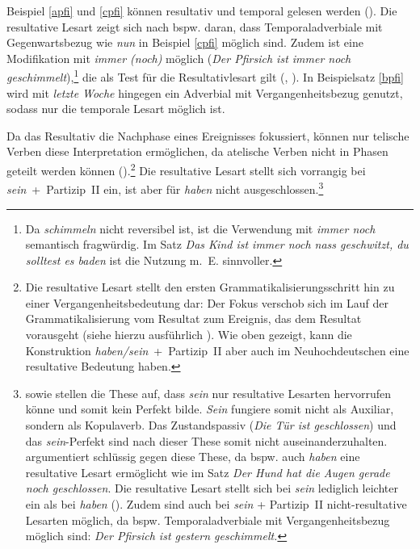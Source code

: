 Beispiel \ref{apfi} und \ref{cpfi} können resultativ und temporal gelesen werden (\cite[66--67]{Gillmann.2016}). Die resultative Lesart zeigt sich nach \textcite[66--67]{Gillmann.2016} bspw. daran, dass Temporaladverbiale mit Gegenwartsbezug wie \textit{nun} in Beispiel \ref{cpfi} möglich sind. Zudem ist eine Modifikation mit \textit{immer (noch)}  möglich (\textit{Der Pfirsich ist immer noch geschimmelt}),\footnote{Da \textit{schimmeln} nicht reversibel ist, ist die Verwendung mit \textit{immer noch} semantisch fragwürdig. Im Satz \textit{Das Kind ist immer noch nass geschwitzt, du solltest es baden} ist die Nutzung m.~E. sinnvoller.} die als Test für die Resultativlesart gilt (\cite[65]{Bybee.1994}, \cite[66]{Gillmann.2016}). In Beispielsatz \ref{bpfi} wird mit \textit{letzte Woche} hingegen ein Adverbial mit Vergangenheitsbezug genutzt, sodass nur die temporale Lesart möglich ist.



Da das Resultativ die Nachphase eines Ereignisses fokussiert, können nur telische Verben diese Interpretation ermöglichen, da atelische Verben nicht in Phasen geteilt werden können (\cite[103]{Teuber.2005}).\footnote{Die resultative Lesart stellt den ersten Grammatikalisierungsschritt hin zu einer Vergangenheitsbedeutung dar: Der Fokus verschob sich im Lauf der Grammatikalisierung vom Resultat zum Ereignis, das dem Resultat vorausgeht  (siehe hierzu ausführlich \cites[206]{Gillmann.2011}[60--68]{Gillmann.2016}). Wie oben gezeigt, kann die Konstruktion \textit{haben/sein}~+~Partizip~II aber auch im Neuhochdeutschen eine resultative Bedeutung haben.} Die resultative Lesart stellt sich vorrangig bei \textit{sein}~+~Partizip~II ein, ist aber für \textit{haben} nicht ausgeschlossen.\footnote{\textcite[182--186]{Leiss.1992} sowie \textcite[122--138]{Teuber.2005} stellen die These auf, dass \textit{sein} nur resultative Lesarten hervorrufen könne und somit kein Perfekt bilde. \textit{Sein} fungiere somit nicht als Auxiliar, sondern als Kopulaverb. Das  Zustandspassiv (\textit{Die Tür ist geschlossen}) und das \textit{sein}-Perfekt sind nach dieser These somit nicht auseinanderzuhalten. \textcite[126--132]{Gillmann.2016} argumentiert schlüssig gegen diese These, da bspw. auch \textit{haben} eine resultative Lesart ermöglicht wie im Satz \textit{Der Hund hat die Augen gerade noch geschlossen}. Die resultative Lesart stellt sich bei \textit{sein} lediglich leichter ein als bei \textit{haben} (\cite[131]{Gillmann.2016}). Zudem sind auch bei \textit{sein} + Partizip~II nicht-resultative Lesarten möglich, da bspw. Temporaladverbiale mit Vergangenheitsbezug möglich sind: \textit{Der Pfirsich ist gestern geschimmelt.}} 

